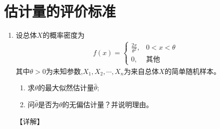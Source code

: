 \documentclass[12pt, a4paper, oneside, UTF8]{ctexbook}
\begin{document}
\section{估计量的评价标准}

\begin{enumerate}[label=\arabic*.,start=4]
    \item 设总体$X$的概率密度为
    \begin{align*}
        f(x)=\begin{cases}
            \frac{2x}{\theta^2}, & 0<x<\theta \\
            0, & \text{其他}
        \end{cases}
    \end{align*}
    其中$\theta>0$为未知参数,$X_1,X_2,\cdots,X_n$为来自总体$X$的简单随机样本。
    \begin{enumerate}
        \item 求$\theta$的最大似然估计量$\hat{\theta}$;
        \item 问$\hat{\theta}$是否为$\theta$的无偏估计量？并说明理由。
    \end{enumerate}
    
    \begin{solution}
    【详解】
    \end{solution}

\end{enumerate}
\ifx\allfiles\undefined
\end{document}
